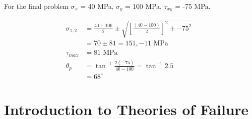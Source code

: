 \documentclass[
10pt,
a4paper,
openany,
svgnames,
]{book}
\begin{document}
\begin{evensolution}
  For the final problem  $\sigma_x$ = 40 MPa, $\sigma_y$ = 100 MPa, $\tau_{xy}$ = -75 MPa.
  
  \begin{align*}
    \sigma_{1,2} &= \frac{40 + 100}{2} \pm \sqrt{ \left[ \frac{(40 - 100)}{2}\right]^2 + -75^2} \\
                 &= 70 \pm 81 = 151, -11 \text{ MPa} \\
    \tau_{max} &= 81 \text{ MPa} \\
    \theta_p &= \tan^{-1} \frac{2(-75)}{40-100} = \tan^{-1} 2.5 \\
                 &= 68^{\circ}
  \end{align*}
\end{evensolution}

\section{Introduction to Theories of Failure}
\end{document}
